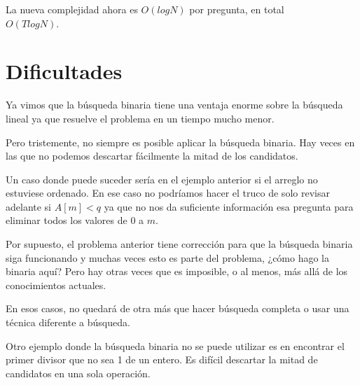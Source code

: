 La nueva complejidad ahora es \(O(logN)\) por pregunta, en total\\ \(O(TlogN)\).

\section{Dificultades}
Ya vimos que la búsqueda binaria tiene una ventaja enorme sobre la búsqueda lineal ya que resuelve el problema en un tiempo mucho menor.

Pero tristemente, no siempre es posible aplicar la búsqueda binaria. Hay veces en las que no podemos descartar fácilmente la mitad de los candidatos.

Un caso donde puede suceder sería en el ejemplo anterior si el arreglo no estuviese ordenado. En ese caso no podríamos hacer el truco de solo revisar adelante si \(A[m]<q\) ya que no nos da suficiente información esa pregunta para eliminar todos los valores de \(0\) a \(m\).

Por supuesto, el problema anterior tiene corrección para que la búsqueda binaria siga funcionando y muchas veces esto es parte del problema, ¿cómo hago la binaria aquí? Pero hay otras veces que es imposible, o al menos, más allá de los conocimientos actuales.

En esos casos, no quedará de otra más que hacer búsqueda completa o usar una técnica diferente a búsqueda.

Otro ejemplo donde la búsqueda binaria no se puede utilizar es en encontrar el primer divisor que no sea 1 de un entero. Es difícil descartar la mitad de candidatos en una sola operación. 




